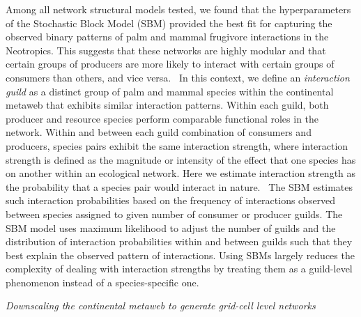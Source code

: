 \documentclass[
]{agujournal2019}
\begin{document}
Among all network structural models tested, we found that the
hyperparameters of the Stochastic Block Model (SBM) provided the best
fit for capturing the observed binary patterns of palm and mammal
frugivore interactions in the Neotropics. This suggests that these
networks are highly modular and that certain groups of producers are
more likely to interact with certain groups of consumers than others,
and vice versa. ~In this context, we define an \emph{interaction guild}
as a distinct group of palm and mammal species within the continental
metaweb that exhibits similar interaction patterns. Within each guild,
both producer and resource species perform comparable functional roles
in the network. Within and between each guild combination of consumers
and producers, species pairs exhibit the same interaction strength,
where interaction strength is defined as the magnitude or intensity of
the effect that one species has on another within an ecological network.
Here we estimate interaction strength as the probability that a species
pair would interact in nature. ~The SBM estimates such interaction
probabilities based on the frequency of interactions observed between
species assigned to given number of consumer or producer guilds. The SBM
model uses maximum likelihood to adjust the number of guilds and the
distribution of interaction probabilities within and between guilds such
that they best explain the observed pattern of interactions. Using SBMs
largely reduces the complexity of dealing with interaction strengths by
treating them as a guild-level phenomenon instead of a species-specific
one. ~

\emph{Downscaling the continental metaweb to generate grid-cell level
networks}
\end{document}
